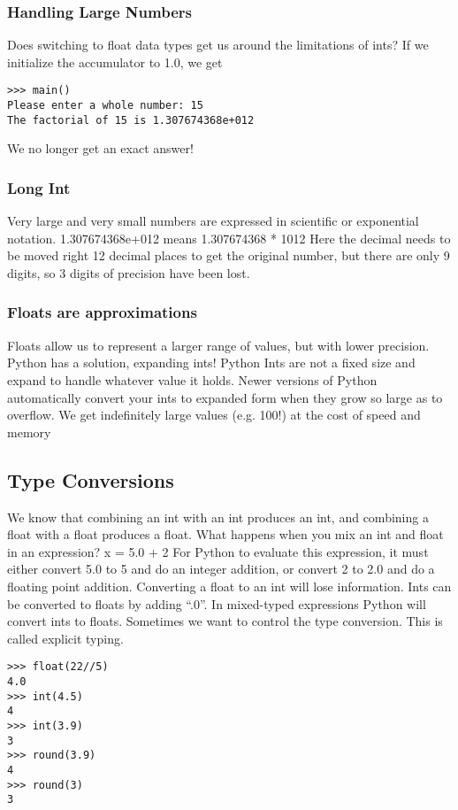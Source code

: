 \documentclass[12pt,a4paper,final,twoside,onecolumn,titlepage]{book}
\begin{document}
\subsubsection{Handling Large Numbers}
Does switching to float data types get us around the limitations of ints?
If we initialize the accumulator to 1.0, we get
\lstset{language=Python, tabsize=4}
\begin{lstlisting}
>>> main()
Please enter a whole number: 15
The factorial of 15 is 1.307674368e+012
\end{lstlisting}
We no longer get an exact answer!
\subsubsection{Long Int}
Very large and very small numbers are expressed in scientific or exponential notation.
1.307674368e+012 means 1.307674368 * 1012
Here the decimal needs to be moved right 12 decimal places to get the original number, but there are only 9 digits, so 3 digits of precision have been lost.
\subsubsection{Floats are approximations}
Floats allow us to represent a larger range of values, but with lower precision. Python has a solution, expanding ints! Python Ints are not a fixed size and expand to handle whatever value it holds. Newer versions of Python automatically convert your ints to expanded form when they grow so large as to overflow. We get indefinitely large values (e.g. 100!) at the cost of speed and memory
\subsection{Type Conversions}
We know that combining an int with an int produces an int, and combining a float with a float produces a float. What happens when you mix an int and float in an expression?
x = 5.0 + 2
For Python to evaluate this expression, it must either convert 5.0 to 5 and do an integer addition, or convert 2 to 2.0 and do a floating point addition. Converting a float to an int will lose information. Ints can be converted to floats by adding “.0”. In mixed-typed expressions Python will convert ints to floats. Sometimes we want to control the type conversion. This is called explicit typing.
\lstset{language=Python, tabsize=4}
\begin{lstlisting}
>>> float(22//5)
4.0
>>> int(4.5)
4
>>> int(3.9)
3
>>> round(3.9)
4
>>> round(3)
3
\end{lstlisting}
\end{document}
